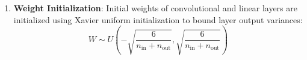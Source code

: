\begin{enumerate}
\item \textbf{Weight Initialization}: Initial weights of convolutional and linear layers are initialized using Xavier uniform initialization to bound layer output variances:
\begin{equation}
    W \sim U\left(-\sqrt{\frac{6}{n_{\text{in}} + n_{\text{out}}}}, \sqrt{\frac{6}{n_{\text{in}} + n_{\text{out}}}}\right)
\end{equation}

\end{enumerate}


